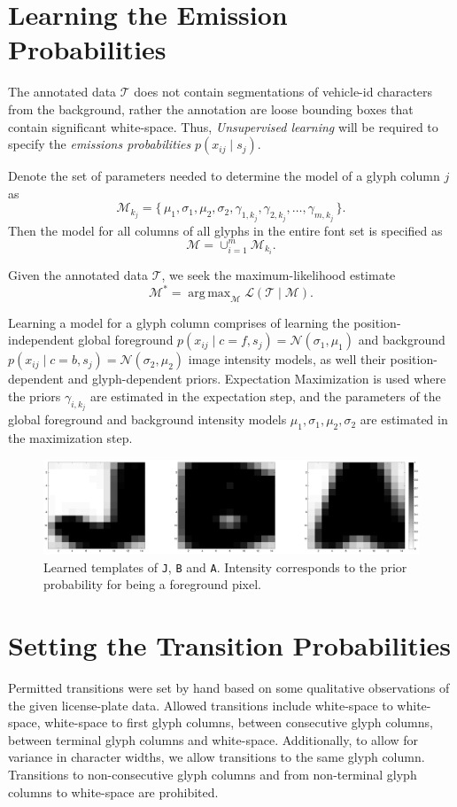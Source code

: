 \documentclass[a4paper,12pt]{article}
\newcommand{\lhood}{\ensuremath{\mathcal{L}}}
\newcommand{\truth}{\ensuremath{\mathcal{T}}}
\newcommand{\model}{\ensuremath{\mathcal{M}}}
\newcommand{\optmodel}{\ensuremath{\mathcal{M}^*}}
\DeclareMathOperator*{\argmax}{arg\,max}
\begin{document}
\section{Learning the Emission Probabilities}
The annotated data $\truth$ does not contain segmentations of
vehicle-id characters from the background, rather the annotation are
loose bounding boxes that contain significant white-space. Thus,
\emph{Unsupervised learning} will be required to specify the
\emph{emissions probabilities} $p(x_{ij} \mid s_j)$.

Denote the set of parameters needed to determine the model of a glyph
column $j$ as
\[\model_{k_j}=\{\,\mu_1,\sigma_1,\mu_2,\sigma_2,\gamma_{1,k_j},\gamma_{2,k_j},\ldots,\gamma_{m,k_j}\,\}.\]
Then the model for all columns of all glyphs in the entire font set is
specified as
\[
\model = \cup_{i=1}^m\model_{k_i}.
\]

Given the annotated data $\truth$, we seek the maximum-likelihood
estimate \[ \optmodel = \argmax_{\model} \lhood(\truth \mid \model).\]

Learning a model for a glyph column comprises of learning the
position-independent global foreground $ p(x_{ij}\mid
c=f,s_j)=\mathcal{N}(\sigma_1,\mu_1)$ and background $p(x_{ij} \mid
c=b,s_j)=\mathcal{N}(\sigma_2,\mu_2)$ image intensity models, as well
their position-dependent and glyph-dependent priors. Expectation
Maximization is used where the priors $\gamma_{i,k_j}$ are estimated
in the expectation step, and the parameters of the global foreground
and background intensity models $\mu_1,\sigma_1,\mu_2,\sigma_2$ are
estimated in the maximization step.

\begin{figure}[htp]
\centering
\includegraphics[width=\linewidth]{pics/jba.png}
\caption{Learned templates of \texttt{J}, \texttt{B} and
  \texttt{A}. Intensity corresponds to the prior probability for being
  a foreground pixel.}
\label{fig:templates}
\end{figure}

\section{Setting the Transition Probabilities}
Permitted transitions were set by hand based on some qualitative
observations of the given license-plate data. Allowed transitions
include white-space to white-space, white-space to first glyph
columns, between consecutive glyph columns, between terminal glyph
columns and white-space. Additionally, to allow for variance in
character widths, we allow transitions to the same glyph
column. Transitions to non-consecutive glyph columns and from
non-terminal glyph columns to white-space are prohibited.
\end{document}

